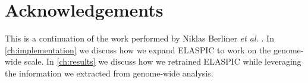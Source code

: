 \section{Acknowledgements}

This is a continuation of the work performed by Niklas Berliner \textit{et al.} \cite{berliner_combining_2014}. In \ref{ch:implementation} we discuss how we expand ELASPIC to work on the genome-wide scale. In \ref{ch:results} we discuss how we retrained ELASPIC while leveraging the information we extracted from genome-wide analysis.
